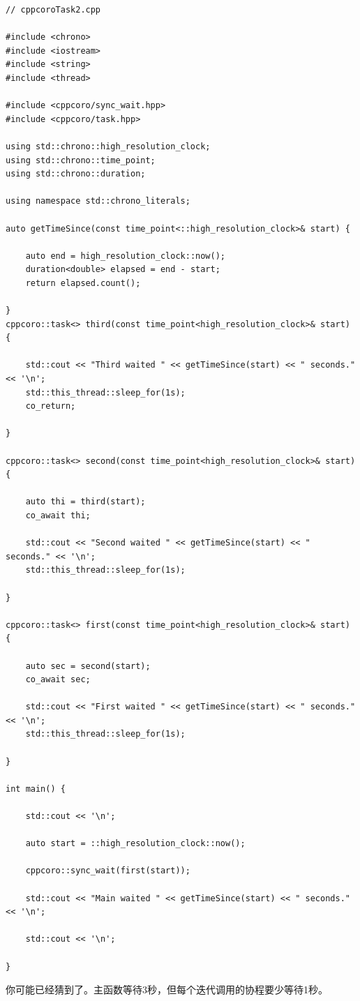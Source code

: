 \begin{lstlisting}[style=styleCXX]
// cppcoroTask2.cpp

#include <chrono>
#include <iostream>
#include <string>
#include <thread>

#include <cppcoro/sync_wait.hpp>
#include <cppcoro/task.hpp>

using std::chrono::high_resolution_clock;
using std::chrono::time_point;
using std::chrono::duration;

using namespace std::chrono_literals;

auto getTimeSince(const time_point<::high_resolution_clock>& start) {

	auto end = high_resolution_clock::now();
	duration<double> elapsed = end - start;
	return elapsed.count();

}
cppcoro::task<> third(const time_point<high_resolution_clock>& start) {

	std::cout << "Third waited " << getTimeSince(start) << " seconds." << '\n';
	std::this_thread::sleep_for(1s);
	co_return;

}

cppcoro::task<> second(const time_point<high_resolution_clock>& start) {

	auto thi = third(start);
	co_await thi;
	
	std::cout << "Second waited " << getTimeSince(start) << " seconds." << '\n';
	std::this_thread::sleep_for(1s);

}

cppcoro::task<> first(const time_point<high_resolution_clock>& start) {

	auto sec = second(start);
	co_await sec;
	
	std::cout << "First waited " << getTimeSince(start) << " seconds." << '\n';
	std::this_thread::sleep_for(1s);

}

int main() {

	std::cout << '\n';
	
	auto start = ::high_resolution_clock::now();
	
	cppcoro::sync_wait(first(start));
	
	std::cout << "Main waited " << getTimeSince(start) << " seconds." << '\n';
	
	std::cout << '\n';

}
\end{lstlisting}

你可能已经猜到了。主函数等待3秒，但每个迭代调用的协程要少等待1秒。

